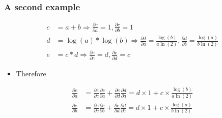 \documentclass{beamer}
\theoremstyle{plain} %
\theoremstyle{example} %
\newcommand{\deriv}[2]{\ensuremath{\frac{\partial #1}{\partial #2}}}
\begin{document}
\begin{frame}
    \frametitle{A second example}
   
\begin{align*}
    c&=a+b\Rightarrow \deriv{c}{a}=1, \deriv{c}{b}=1\\
    d&=\log(a)*\log(b)\Rightarrow \deriv{d}{a}=\frac{\log(b)}{a\ln(2)},\deriv{d}{b}=\frac{\log(a)}{b\ln(2)}\\
    e&=c*d\Rightarrow \deriv{e}{c}=d,\deriv{e}{d}=c
\end{align*}    
\begin{itemize}
    \item Therefore
\end{itemize}
\begin{align*}
    \deriv{e}{a}&=\deriv{e}{c}\deriv{c}{a}+\deriv{e}{d}\deriv{d}{a}=d\times 1+c\times \frac{\log(b)}{a\ln(2)}\\
    \deriv{e}{b}&=\deriv{e}{c}\deriv{c}{b}+\deriv{e}{d}\deriv{d}{b}=d\times 1+c\times \frac{\log(a)}{b\ln(2)}
\end{align*}
\end{frame}
\end{document}
